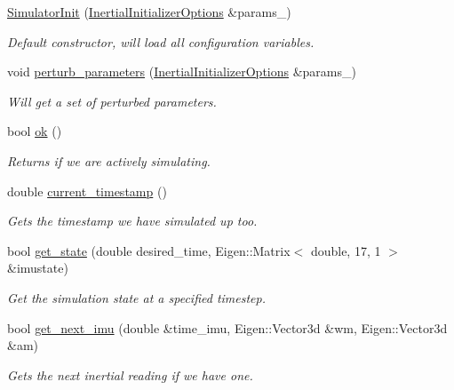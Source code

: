 \begin{DoxyCompactItemize}
\item 
\hyperlink{classov__init_1_1SimulatorInit_a6f8df388f25c2d90411bd51ade48c6e4}{Simulator\+Init} (\hyperlink{structov__init_1_1InertialInitializerOptions}{Inertial\+Initializer\+Options} \&params\+\_\+)
\begin{DoxyCompactList}\small\item\em Default constructor, will load all configuration variables. \end{DoxyCompactList}\item 
void \hyperlink{classov__init_1_1SimulatorInit_a34f9e98902032aeb2b695e1f72f56d15}{perturb\+\_\+parameters} (\hyperlink{structov__init_1_1InertialInitializerOptions}{Inertial\+Initializer\+Options} \&params\+\_\+)
\begin{DoxyCompactList}\small\item\em Will get a set of perturbed parameters. \end{DoxyCompactList}\item 
bool \hyperlink{classov__init_1_1SimulatorInit_a9a251dce8d062f3b152f9fa72a7f5dd1}{ok} ()
\begin{DoxyCompactList}\small\item\em Returns if we are actively simulating. \end{DoxyCompactList}\item 
double \hyperlink{classov__init_1_1SimulatorInit_aca29b02e15f68526724d2dae56d2f756}{current\+\_\+timestamp} ()
\begin{DoxyCompactList}\small\item\em Gets the timestamp we have simulated up too. \end{DoxyCompactList}\item 
bool \hyperlink{classov__init_1_1SimulatorInit_abe1fc7470175ceb0b60a9ba8461a21b3}{get\+\_\+state} (double desired\+\_\+time, Eigen\+::\+Matrix$<$ double, 17, 1 $>$ \&imustate)
\begin{DoxyCompactList}\small\item\em Get the simulation state at a specified timestep. \end{DoxyCompactList}\item 
bool \hyperlink{classov__init_1_1SimulatorInit_a84a06f52d0de40b6e3ce274a47512e9e}{get\+\_\+next\+\_\+imu} (double \&time\+\_\+imu, Eigen\+::\+Vector3d \&wm, Eigen\+::\+Vector3d \&am)
\begin{DoxyCompactList}\small\item\em Gets the next inertial reading if we have one. \end{DoxyCompactList}\item 

\end{DoxyCompactItemize}
